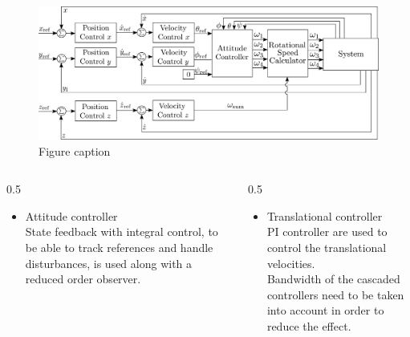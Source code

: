 \begin{figure}
	\includegraphics[width=0.7\linewidth]{figures/TranslationalControlDiagram}
	\caption{Figure caption}
\end{figure}


\begin{columns}[t,totalwidth=\twocolwid] %
	
	\begin{column}{0.5\twocolwid} %
  	 \centering
  	 \vspace{.5cm}
  	 \parbox{.95\textwidth}{
    	 \begin{itemize}
  	 			\item Attitude controller\\
  	 			State feedback with integral control, to be able to track references and handle disturbances, is used along with a reduced order observer.
  	 		\end{itemize}
  	 }\vspace{.5cm}
	\end{column} %
	
	\begin{column}{0.5\twocolwid} %
  	 \centering
   	 \vspace{.5cm}
   	 \parbox{.9\textwidth}{
       	 \begin{itemize}
    	 			\item Translational controller\\
     	 			PI controller are used to control the translational velocities.\\
     	 			Bandwidth of the cascaded controllers need to be taken into account in order to reduce the effect.
       	 \end{itemize}		
   	 }\vspace{.5cm}
	\end{column} %
	
\end{columns} %